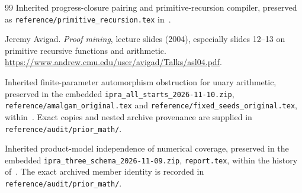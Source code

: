 \documentclass[11pt,letterpaper]{article}
\theoremstyle{definition}\newtheorem{definition}[theorem]{Definition}
\theoremstyle{remark}\newtheorem{remark}[theorem]{Remark}
\newcommand{\file}[1]{{\small\nolinkurl{#1}}}
\begin{document}
\begin{thebibliography}{99}
Inherited progress-closure pairing and primitive-recursion compiler,
preserved as \file{reference/primitive_recursion.tex} in~\cite{flat}.

Jeremy Avigad. \emph{Proof mining}, lecture slides (2004),
especially slides 12--13 on primitive recursive functions and arithmetic.
\url{https://www.andrew.cmu.edu/user/avigad/Talks/asl04.pdf}.

Inherited finite-parameter automorphism obstruction for unary arithmetic,
preserved in the embedded \file{ipra_all_starts_2026-11-10.zip},
\file{reference/amalgam_original.tex} and
\file{reference/fixed_seeds_original.tex}, within~\cite{snapshot}.
Exact copies and nested archive provenance are supplied in
\file{reference/audit/prior_math/}.

Inherited product-model independence of numerical coverage,
preserved in the embedded \file{ipra_three_schema_2026-11-09.zip},
\file{report.tex}, within the history of~\cite{snapshot}.
The exact archived member identity is recorded in
\file{reference/audit/prior_math/}.
\end{thebibliography}
\end{document}
